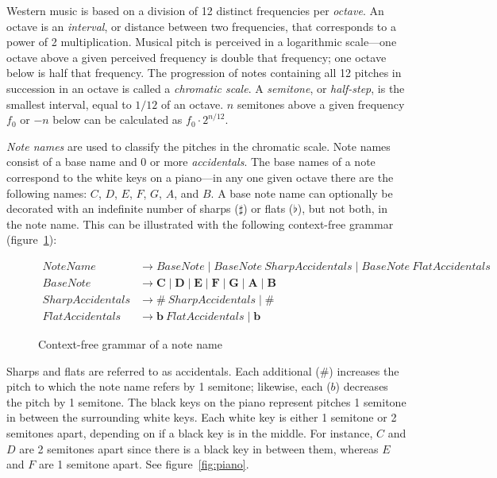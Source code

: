 Western music is based on a division of 12 distinct frequencies per \textit{octave}. An octave is an \textit{interval}, or distance between two frequencies, that corresponds to a power of 2 multiplication. Musical pitch is perceived in a logarithmic scale---one octave above a given perceived frequency is double that frequency; one octave below is half that frequency. The progression of notes containing all 12 pitches in succession in an octave is called a \textit{chromatic scale}. A \textit{semitone}, or \textit{half-step}, is the smallest interval, equal to $1/12$ of an octave. $n$ semitones above a given frequency $f_0$ or $-n$ below can be calculated as $f_0 \cdot 2^{n/12}$.

\textit{Note names} are used to classify the pitches in the chromatic scale. Note names consist of a base name and 0 or more \textit{accidentals}. The base names of a note correspond to the white keys on a piano---in any one given octave there are the following names: $C$, $D$, $E$, $F$, $G$, $A$, and $B$. A base note name can optionally be decorated with an indefinite number of sharps ($\sharp$) or flats ($\flat$), but not both, in the note name. This can be illustrated with the following context-free grammar (figure~\ref{fig:cfgnote}):
\begin{figure}[h!]
\centering
\begin{align*}
NoteName &\to BaseNote \mid BaseNote\ SharpAccidentals \mid BaseNote\ FlatAccidentals \\
BaseNote &\to \mathbf{C} \mid \mathbf{D} \mid \mathbf{E} \mid \mathbf{F} \mid \mathbf{G} \mid \mathbf{A} \mid \mathbf{B} \\
SharpAccidentals &\to \bm{\textit{\#}}\ SharpAccidentals \mid \bm{\textit{\#}} \\
FlatAccidentals &\to \bm{b}\ FlatAccidentals \mid \bm{b}
\end{align*}
\caption{Context-free grammar of a note name}
\label{fig:cfgnote}
\end{figure}

Sharps and flats are referred to as accidentals. Each additional ($\#$) increases the pitch to which the note name refers by 1 semitone; likewise, each ($b$) decreases the pitch by 1 semitone.  The black keys on the piano represent pitches 1 semitone in between the surrounding white keys. Each white key is either 1 semitone or 2 semitones apart, depending on if a black key is in the middle. For instance, $C$ and $D$ are 2 semitones apart since there is a black key in between them, whereas $E$ and $F$ are 1 semitone apart. See figure~\ref{fig:piano}.
